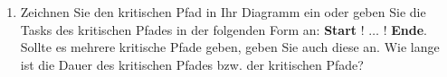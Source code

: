 \documentclass{lehramt-informatik-aufgabe}
\begin{document}
\begin{enumerate}

\item Zeichnen Sie den kritischen Pfad in Ihr Diagramm ein oder geben
Sie die Tasks des kritischen Pfades in der folgenden Form an:
\textbf{Start} ! $\dots$ ! \textbf{Ende}. Sollte es mehrere kritische
Pfade geben, geben Sie auch diese an. Wie lange ist die Dauer des
kritischen Pfades bzw. der kritischen Pfade?

\end{enumerate}
\end{document}
